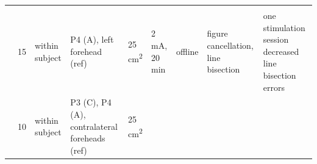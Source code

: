 \documentclass[11pt,english,]{memoir}
\begin{document}
\begin{longtable}[]{@{}lllllllll@{}}
\begin{minipage}[t]{0.28\columnwidth}
\end{minipage}\tabularnewline
\begin{minipage}[t]{0.09\columnwidth}\raggedright
\textcite{Ko2008}\strut
\end{minipage} & \begin{minipage}[t]{0.02\columnwidth}\raggedright
15\strut
\end{minipage} & \begin{minipage}[t]{0.04\columnwidth}\raggedright
within
subject\strut
\end{minipage} & \begin{minipage}[t]{0.10\columnwidth}\raggedright
P4 (A), left
forehead (ref)\strut
\end{minipage} & \begin{minipage}[t]{0.04\columnwidth}\raggedright
25
cm\textsuperscript{2}\strut
\end{minipage} & \begin{minipage}[t]{0.04\columnwidth}\raggedright
2 mA,
20 min\strut
\end{minipage} & \begin{minipage}[t]{0.04\columnwidth}\raggedright
offline\strut
\end{minipage} & \begin{minipage}[t]{0.10\columnwidth}\raggedright
figure cancellation,
line bisection\strut
\end{minipage} & \begin{minipage}[t]{0.28\columnwidth}\raggedright
one stimulation session decreased line bisection errors\strut
\end{minipage}\tabularnewline
\begin{minipage}[t]{0.09\columnwidth}\raggedright
\textcite{Sunwoo2013}\strut
\end{minipage} & \begin{minipage}[t]{0.02\columnwidth}\raggedright
10\strut
\end{minipage} & \begin{minipage}[t]{0.04\columnwidth}\raggedright
within
subject\strut
\end{minipage} & \begin{minipage}[t]{0.10\columnwidth}\raggedright
P3 (C), P4 (A),
contralateral
foreheads (ref)\strut
\end{minipage} & \begin{minipage}[t]{0.04\columnwidth}\raggedright
25
cm\textsuperscript{2}\strut
\end{minipage} & \begin{minipage}[t]{0.04\columnwidth}\raggedright

\end{minipage}
\end{longtable}
\end{document}
